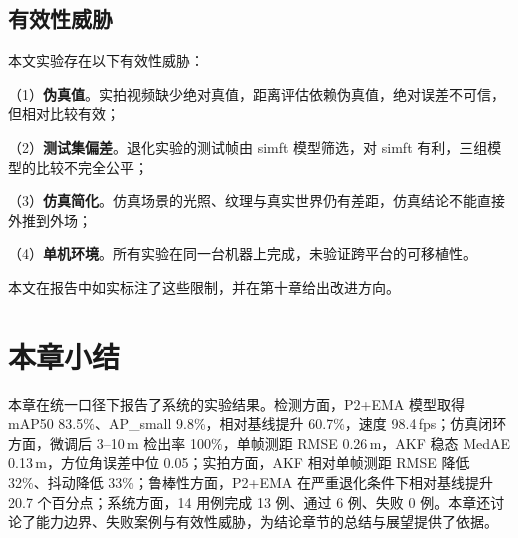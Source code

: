 \subsection{有效性威胁}

本文实验存在以下有效性威胁：

（1）\textbf{伪真值}。实拍视频缺少绝对真值，距离评估依赖伪真值，绝对误差不可信，但相对比较有效；

（2）\textbf{测试集偏差}。退化实验的测试帧由 simft 模型筛选，对 simft 有利，三组模型的比较不完全公平；

（3）\textbf{仿真简化}。仿真场景的光照、纹理与真实世界仍有差距，仿真结论不能直接外推到外场；

（4）\textbf{单机环境}。所有实验在同一台机器上完成，未验证跨平台的可移植性。

本文在报告中如实标注了这些限制，并在第十章给出改进方向。

\section{本章小结}

本章在统一口径下报告了系统的实验结果。检测方面，P2+EMA 模型取得 mAP50 83.5\%、AP\_small 9.8\%，相对基线提升 60.7\%，速度 98.4\,fps；仿真闭环方面，微调后 3--10\,m 检出率 100\%，单帧测距 RMSE 0.26\,m，AKF 稳态 MedAE 0.13\,m，方位角误差中位 0.05\textdegree；实拍方面，AKF 相对单帧测距 RMSE 降低 32\%、抖动降低 33\%；鲁棒性方面，P2+EMA 在严重退化条件下相对基线提升 20.7 个百分点；系统方面，14 用例完成 13 例、通过 6 例、失败 0 例。本章还讨论了能力边界、失败案例与有效性威胁，为结论章节的总结与展望提供了依据。

